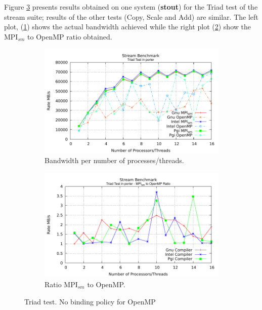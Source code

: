 \medskip

Figure \ref{fig:TriadTestBefore} presents results obtained on one system (\textbf{stout}) for the Triad test of the stream suite; results of the other tests (Copy, Scale and Add) are similar. The left plot, (\ref{fig:TriadBefore}) shows the actual bandwidth achieved while the right plot (\ref{fig:TriadRatioBefore}) show the MPI$_{sm}$ to OpenMP ratio obtained.
 
\medskip

\begin{figure} [h!]
    \centering
    \captionsetup{justification=centering, singlelinecheck=false}
    \begin{subfigure}{.6\textwidth}
      \hspace*{-1.5cm} 
      \includegraphics[width=0.95\linewidth]{Plots/streamBenchmark/porter-TriadBefore.pdf}
      \caption[]{Bandwidth per number of processes/threads.}
      \label{fig:TriadBefore}
    \end{subfigure}%
    \begin{subfigure}{.6\textwidth}
      \hspace*{-1.5cm} 
      \includegraphics[width=0.95\linewidth]{Plots/streamBenchmark/porter-TriadRatioBefore.pdf}
      \caption{Ratio MPI$_{sm}$ to OpenMP.}
      \label{fig:TriadRatioBefore}
    \end{subfigure}
    \caption{Triad test. No binding policy for OpenMP}
\label{fig:TriadTestBefore}
\end{figure}


